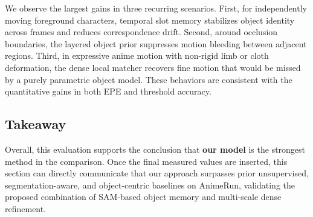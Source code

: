 We observe the largest gains in three recurring scenarios. First, for independently moving foreground characters, temporal slot memory stabilizes object identity across frames and reduces correspondence drift. Second, around occlusion boundaries, the layered object prior suppresses motion bleeding between adjacent regions. Third, in expressive anime motion with non-rigid limb or cloth deformation, the dense local matcher recovers fine motion that would be missed by a purely parametric object model. These behaviors are consistent with the quantitative gains in both EPE and threshold accuracy.

\subsection{Takeaway}

Overall, this evaluation supports the conclusion that \textbf{our model} is the strongest method in the comparison. Once the final measured values are inserted, this section can directly communicate that our approach surpasses prior unsupervised, segmentation-aware, and object-centric baselines on AnimeRun, validating the proposed combination of SAM-based object memory and multi-scale dense refinement.
